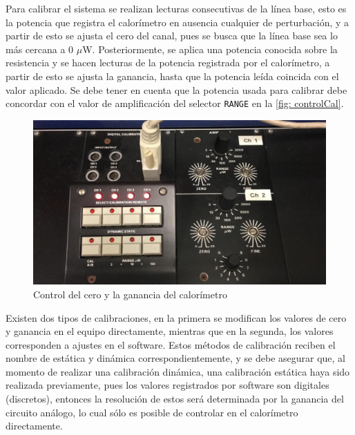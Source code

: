 	Para calibrar el sistema se realizan lecturas consecutivas de la línea base, esto es la potencia que registra el calorímetro en ausencia cualquier de perturbación, y a partir de esto se ajusta el cero del canal, pues se busca que la línea base sea lo más cercana a 0 $\mu$W. Posteriormente, se aplica una potencia conocida sobre la resistencia y se hacen lecturas de la potencia registrada por el calorímetro, a partir de esto se ajusta la ganancia, hasta que la potencia le\'ida coincida con el valor aplicado. Se debe tener en cuenta que la potencia usada para calibrar debe concordar con el valor de amplificación del selector \texttt{RANGE} en la \autoref{fig: controlCal}.
	\begin{figure}[h]
		\centering
		\includegraphics[width=0.7\linewidth]{Figures/controlCal}
		\caption{Control del cero y la ganancia del calor\'imetro}
		\label{fig: controlCal}
	\end{figure}
	
	Existen dos tipos de calibraciones, en la primera se modifican los valores de cero y ganancia en el equipo directamente, mientras que en la segunda, los valores corresponden a ajustes en el software. Estos métodos de calibración reciben el nombre de estática y dinámica correspondientemente, y se debe asegurar que, al momento de realizar una calibración dinámica, una calibración estática haya sido realizada previamente, pues los valores registrados por software son digitales (discretos), entonces la resolución de estos será determinada por la ganancia del circuito análogo, lo cual sólo es posible de controlar en el calorímetro directamente.
	 

